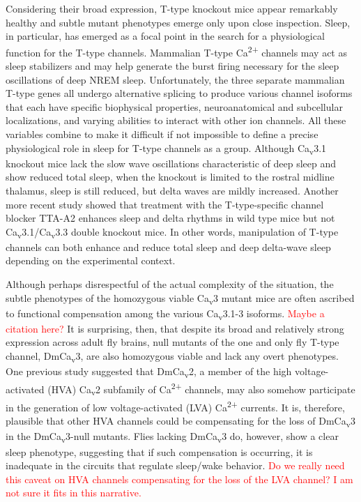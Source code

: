Considering their broad expression, T-type knockout mice appear remarkably healthy and subtle mutant phenotypes emerge only upon close inspection.
Sleep, in particular, has emerged as a focal point in the search for a physiological function for the T-type channels.
Mammalian T-type Ca\textsuperscript{2+} channels may act as sleep stabilizers and may help generate the burst firing necessary for the sleep oscillations of deep NREM sleep.
Unfortunately, the three separate mammalian T-type genes all undergo alternative splicing to produce various channel isoforms that each have specific biophysical properties, neuroanatomical and subcellular localizations, and varying abilities to interact with other ion channels.
All these variables combine to make it difficult if not impossible to define a precise physiological role in sleep for T-type channels as a group.
Although Ca\textsubscript{v}3.1 knockout mice lack the slow wave oscillations characteristic of deep sleep and show reduced total sleep\cite{Lee:2004ey}, when the knockout is limited to the rostral midline thalamus, sleep is still reduced, but delta waves are mildly increased\cite{anderson:2005aa}. Another more recent study showed that treatment with the T-type-specific channel blocker TTA-A2 enhances sleep and delta rhythms in wild type mice but not Ca\textsubscript{v}3.1/Ca\textsubscript{v}3.3 double knockout mice\cite{kraus:2010aa}. In other words, manipulation of T-type channels can both enhance and reduce total sleep and deep delta-wave sleep depending on the experimental context.

Although perhaps disrespectful of the actual complexity of the situation, the subtle phenotypes of the homozygous viable Ca\textsubscript{v}3 mutant mice are often ascribed to functional compensation among the various Ca\textsubscript{v}3.1-3 isoforms. \textcolor{red}{Maybe a citation here?}
It is surprising, then, that despite its broad and relatively strong expression across adult fly brains, null mutants of the one and only fly T-type channel, DmCa\textsubscript{v}3, are also homozygous viable and lack any overt phenotypes.
One previous study suggested that DmCa\textsubscript{v}2, a member of the high voltage-activated (HVA) Ca\textsubscript{v}2 subfamily of Ca\textsuperscript{2+} channels, may also somehow participate in the generation of low voltage-activated (LVA) Ca\textsuperscript{2+} currents\cite{Ryglewski:2012jk}.
It is, therefore, plausible that other HVA channels could be compensating for the loss of DmCa\textsubscript{v}3 in the DmCa\textsubscript{v}3-null mutants.
Flies lacking DmCa\textsubscript{v}3 do, however, show a clear sleep phenotype, suggesting that if such compensation is occurring, it is inadequate in the circuits that regulate sleep/wake behavior. \textcolor{red}{Do we really need this caveat on HVA channels compensating for the loss of the LVA channel? I am not sure it fits in this narrative.}

